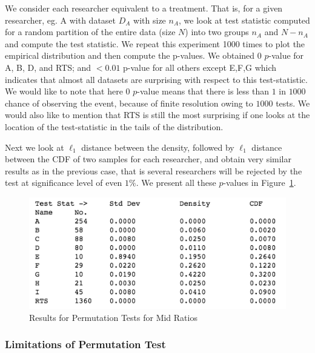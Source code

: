 \documentclass{article}
\begin{document}
We consider each researcher equivalent to a treatment. That is, for a
given researcher, eg. A with dataset \(D_A\) with size \(n_A\), we look
at test statistic computed for a random partition of the entire data
(size \(N\)) into two groups \(n_A\) and \(N-n_A\) and compute the test
statistic. We repeat this experiment 1000 times to plot the empirical
distribution and then compute the p-values. We obtained $0$ $p$-value for A, B,
D, and RTS; and \(<0.01\) p-value for all others except E,F,G which
indicates that almost all datasets are surprising with respect to this
test-statistic. We would like to note that here $0$ $p$-value means that there is less than $1$ in $1000$ chance of observing the event, because of finite resolution owing to $1000$ tests. We would also like to mention that RTS is still the most surprising if one looks at the location of the test-statistic in the
tails of the distribution.

Next we look at \(\ell_1\) distance between the density, followed by
\(\ell_1\) distance between the CDF of two samples for each researcher,
and obtain very similar results as in the previous case, that is several
researchers will be rejected by the test at significance level of even
\(1 \%\). We present all these $p$-values in Figure~\ref{mid_ratio_perm}.

\begin{figure}[htbp]
\centering
\includegraphics[width=0.8\linewidth]{images/mid_ratio_perm.png}
\caption{Results for Permutation Tests for Mid Ratios}
\label{mid_ratio_perm}
\end{figure}

\subsubsection{Limitations of Permutation Test} %
\label{ssub:limitations_of_permutation_test}
\end{document}
